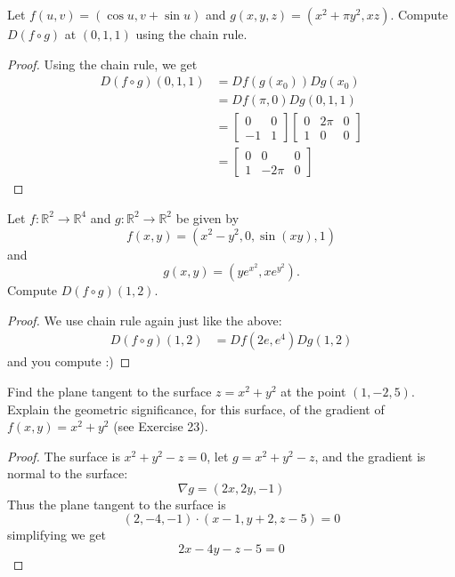 \documentclass[openany]{book}
\begin{document}
\begin{prob}[5]
    Let \( f(u, v) = (\cos u, v + \sin u) \) and  
    \( g(x, y, z) = (x^2 + \pi y^2, xz) \). Compute \( D(f \circ g) \) at \((0, 1, 1)\) using the chain rule.
\end{prob}
\begin{proof}
    Using the chain rule, we get 
    \begin{align*}
        D(f\circ g)(0,1,1)&=Df(g(x_0))Dg(x_0)\\
        &=Df(\pi, 0)Dg(0,1,1)\\
        &=\begin{bmatrix}
            0&0\\
            -1&1
        \end{bmatrix}\begin{bmatrix}
            0&2\pi &0\\
            1&0&0
        \end{bmatrix}\\
        &=\begin{bmatrix}
            0&0&0\\
            1&-2\pi&0
        \end{bmatrix}
    \end{align*}
\end{proof}

\begin{prob}[20]
    Let \( f: \mathbb{R}^2 \rightarrow \mathbb{R}^4 \) and \( g: \mathbb{R}^2 \rightarrow \mathbb{R}^2 \) be given by
    \[
    f(x, y) = (x^2 - y^2, 0, \sin(xy), 1)
    \]
    and
    \[
    g(x, y) = (ye^{x^2}, xe^{y^2}).
    \]
    Compute \( D(f \circ g)(1, 2) \).
\end{prob}
\begin{proof}
    We use chain rule again just like the above:
    \begin{align*}
        D(f\circ g)(1,2)&=Df(2e, e^4)Dg(1,2)
    \end{align*}
    and you compute :)
\end{proof}


\begin{prob}[24]
    Find the plane tangent to the surface \( z = x^2 + y^2 \) at the point \( (1, -2, 5) \). Explain the geometric significance, for this surface, of the gradient of \( f(x, y) = x^2 + y^2 \) (see Exercise 23).
\end{prob}
\begin{proof}
    The surface is $x^2+y^2-z=0$, let $g=x^2+y^2-z$, and the gradient is normal to the surface:
    \begin{equation*}
        \nabla g=(2x, 2y, -1)
    \end{equation*}
    Thus the plane tangent to the surface is 
    \begin{equation*}
        (2, -4, -1)\cdot (x-1, y+2, z-5)=0
    \end{equation*}
    simplifying we get 
    \begin{equation*}
        2x-4y-z-5=0
    \end{equation*}
\end{proof}
\end{document}
